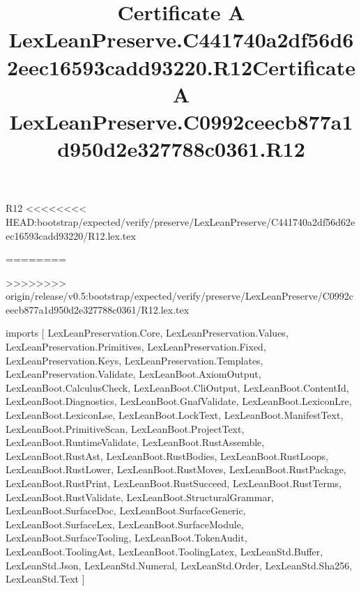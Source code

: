 \begin{lexlean}{R12}
<<<<<<<< HEAD:bootstrap/expected/verify/preserve/LexLeanPreserve/C441740a2df56d62eec16593cadd93220/R12.lex.tex
\title{Certificate A LexLeanPreserve.C441740a2df56d62eec16593cadd93220.R12}
========
\title{Certificate A LexLeanPreserve.C0992ceecb877a1d950d2e327788c0361.R12}
>>>>>>>> origin/release/v0.5:bootstrap/expected/verify/preserve/LexLeanPreserve/C0992ceecb877a1d950d2e327788c0361/R12.lex.tex
\begin{coremodule}
imports [
  LexLeanPreservation.Core,
  LexLeanPreservation.Values,
  LexLeanPreservation.Primitives,
  LexLeanPreservation.Fixed,
  LexLeanPreservation.Keys,
  LexLeanPreservation.Templates,
  LexLeanPreservation.Validate,
  LexLeanBoot.AxiomOutput,
  LexLeanBoot.CalculusCheck,
  LexLeanBoot.CliOutput,
  LexLeanBoot.ContentId,
  LexLeanBoot.Diagnostics,
  LexLeanBoot.GnafValidate,
  LexLeanBoot.LexiconLre,
  LexLeanBoot.LexiconLse,
  LexLeanBoot.LockText,
  LexLeanBoot.ManifestText,
  LexLeanBoot.PrimitiveScan,
  LexLeanBoot.ProjectText,
  LexLeanBoot.RuntimeValidate,
  LexLeanBoot.RustAssemble,
  LexLeanBoot.RustAst,
  LexLeanBoot.RustBodies,
  LexLeanBoot.RustLoops,
  LexLeanBoot.RustLower,
  LexLeanBoot.RustMoves,
  LexLeanBoot.RustPackage,
  LexLeanBoot.RustPrint,
  LexLeanBoot.RustSucceed,
  LexLeanBoot.RustTerms,
  LexLeanBoot.RustValidate,
  LexLeanBoot.StructuralGrammar,
  LexLeanBoot.SurfaceDoc,
  LexLeanBoot.SurfaceGeneric,
  LexLeanBoot.SurfaceLex,
  LexLeanBoot.SurfaceModule,
  LexLeanBoot.SurfaceTooling,
  LexLeanBoot.TokenAudit,
  LexLeanBoot.ToolingAst,
  LexLeanBoot.ToolingLatex,
  LexLeanStd.Buffer,
  LexLeanStd.Json,
  LexLeanStd.Numeral,
  LexLeanStd.Order,
  LexLeanStd.Sha256,
  LexLeanStd.Text
]


\end{coremodule}
\end{lexlean}
